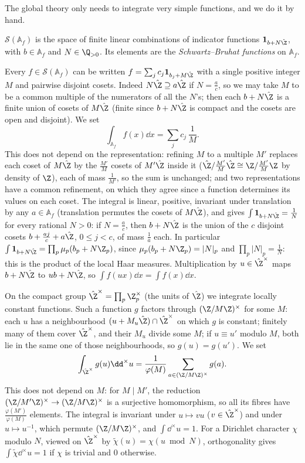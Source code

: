 The global theory only needs to integrate very simple functions, and we do it by hand.

\begin{definition}
$\mathcal S(\mathbb{A}_f)$ is the space of finite linear combinations of indicator functions $\mathbf 1_{b+N\hat{\Z}}$, with $b\in\mathbb{A}_f$ and $N\in\Q_{>0}$.
Its elements are the \emph{Schwartz--Bruhat functions} on $\mathbb{A}_f$.
\end{definition}

Every $f\in\mathcal S(\mathbb{A}_f)$ can be written $f=\sum_jc_j\mathbf 1_{b_j+M\hat{\Z}}$ with a single positive integer $M$ and pairwise disjoint
cosets. Indeed $N\hat{\Z}\supseteq a\hat{\Z}$ if $N=\frac ac$, so we may take $M$ to be a common multiple of the numerators of all the $N$'s;
then each $b+N\hat{\Z}$ is a finite union of cosets of $M\hat{\Z}$ (finite since $b+N\hat{\Z}$ is compact and the cosets are open and
disjoint). We set
\[
\int_{\mathbb{A}_f}f(x)\dd x=\sum_jc_j\,\frac1M.
\]
This does not depend on the representation: refining $M$ to a multiple $M'$ replaces each coset of $M\hat{\Z}$ by the $\frac{M'}M$ cosets of
$M'\hat{\Z}$ inside it ($\hat{\Z}/\frac{M'}M\hat{\Z}\cong\Z/\frac{M'}M\Z$ by density of $\Z$), each of mass $\frac1{M'}$, so the sum is unchanged; and two
representations have a common refinement, on which they agree since a function determines its values on each coset. The integral is
linear, positive, invariant under translation by any $a\in\mathbb{A}_f$ (translation permutes the cosets of $M\hat{\Z}$), and gives
$\int\mathbf 1_{b+N\hat{\Z}}=\frac1N$ for every rational $N>0$: if $N=\frac ac$, then $b+N\hat{\Z}$ is the union of the $c$ disjoint cosets
$b+\frac{aj}c+a\hat{\Z}$, $0\le j<c$, of mass $\frac1a$ each. In particular $\int\mathbf 1_{b+N\hat{\Z}}=\prod_p\mu_p(b_p+N\Z_p)$, since
$\mu_p(b_p+N\Z_p)=|N|_p$ and $\prod_p|N|_p=\frac1N$: this is the product of the local Haar measures. Multiplication by
$u\in\hat{\Z}^\times$ maps $b+N\hat{\Z}$ to $ub+N\hat{\Z}$, so $\int f(ux)\dd x=\int f(x)\dd x$.

On the compact group $\hat{\Z}^\times=\prod_p\Z_p^\times$ (the units of $\hat{\Z}$) we integrate locally constant functions. Such a function
$g$ factors through $(\Z/M\Z)^\times$ for some $M$: each $u$ has a neighbourhood $(u+M_u\hat{\Z})\cap\hat{\Z}^\times$ on which $g$ is constant;
finitely many of them cover $\hat{\Z}^\times$, and their $M_u$ divide some $M$; if $u\equiv u'$ modulo $M$, both lie in the same one of those
neighbourhoods, so $g(u)=g(u')$. We set
\[
\int_{\hat{\Z}^\times}g(u)\dd^\times u=\frac1{\varphi(M)}\sum_{a\in(\Z/M\Z)^\times}g(a).
\]
This does not depend on $M$: for $M\mid M'$, the reduction $(\Z/M'\Z)^\times\to(\Z/M\Z)^\times$ is a surjective homomorphism, so all its fibres
have $\frac{\varphi(M')}{\varphi(M)}$ elements. The integral is invariant under $u\mapsto vu$ ($v\in\hat{\Z}^\times$) and under $u\mapsto u^{-1}$,
which permute $(\Z/M\Z)^\times$, and $\int\dd^\times u=1$. For a Dirichlet character $\chi$ modulo $N$, viewed on $\hat{\Z}^\times$ by
$\tilde\chi(u)=\chi(u\bmod N)$, orthogonality gives $\int\tilde\chi\dd^\times u=1$ if $\chi$ is trivial and $0$ otherwise.

